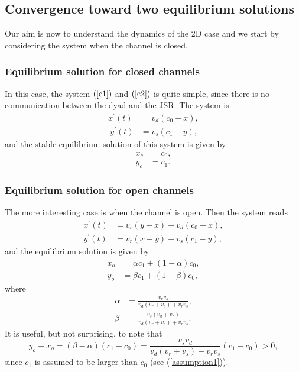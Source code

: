 \subsection{Convergence toward two equilibrium solutions}

Our aim is now to understand the dynamics of the 2D case and we start by
considering the system when the channel is closed.

\subsubsection{Equilibrium solution for closed channels}

In this case, the system $\left(  \ref{c1}\right)$ and $\left(\ref{c2}\right)  $ is quite simple, since
there is no communication between the dyad and the JSR. The system is
\begin{align}
x^{\prime}(t)  &  =v_{d}\left(  c_{0}-x\right)  \label{x_c},\\ \
y^{\prime}(t)  &  =v_{s}\left(  c_{1}-y\right)  \label{y_c},
\end{align}
and the stable equilibrium solution of this system is given by%
\begin{align*}
x_{c}  &  =c_{0},\\
y_{c}  &  =c_{1}.
\end{align*}


\subsubsection{Equilibrium solution for open channels}

The more interesting case is when the channel is open. Then the system reads%
\begin{align}
x^{\prime}(t)  &  =v_{r}\left(  y-x\right)  +v_{d}\left(  c_{0}-x\right) \label{x_o} ,\\
y^{\prime}(t)  &  =v_{r}\left(  x-y\right)  +v_{s}\left(  c_{1}-y\right) \label{y_o}, 
\end{align}
and the equilibrium solution is given by%
\begin{align*}
x_{o}  &  =\alpha c_{1}+\left(  1-\alpha\right)  c_{0},\\
y_{o}  &  =\beta c_{1}+\left(  1-\beta\right)  c_{0},
\end{align*}
where%
\begin{align*}
\alpha &  =\frac{v_{r}v_{s}}{v_{d}\left(  v_{r}+v_{s}\right)  +v_{r}v_{s}},\\
\beta &  =\frac{v_{s}\left(  v_{d}+v_{r}\right)  }{v_{d}\left(  v_{r}%
+v_{s}\right)  +v_{r}v_{s}}.
\end{align*}
It is useful, but not surprising, to note that%
\[
y_{o}-x_{o}=\left(  \beta-\alpha\right)  \left(  c_{1}-c_{0}\right)
=\frac{v_{s}v_{d}}{v_{d}\left(  v_{r}+v_{s}\right)  +v_{r}v_{s}}\left(
c_{1}-c_{0}\right)  >0,
\]
since $c_{1}$ is assumed to be larger than $c_{0}$ (see (\ref{assumption1})).

